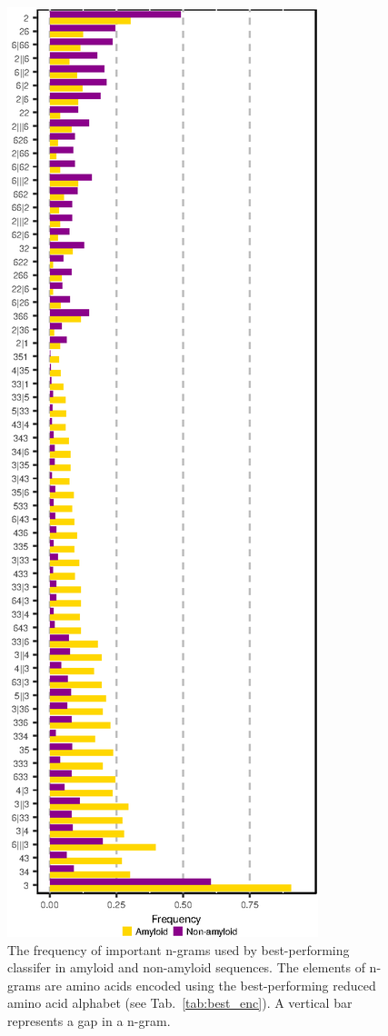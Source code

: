 \documentclass{bioinfo}
\begin{document}
\begin{figure}[!tpb]
\centerline{\includegraphics{figures/ngrams.eps}}
\caption{The frequency of important n-grams used by best-performing classifer 
in amyloid and non-amyloid sequences. The elements of n-grams 
are amino acids encoded using the best-performing reduced amino acid 
alphabet (see Tab.~\ref{tab:best_enc}). A vertical bar 
represents a gap in a n-gram.}\label{fig:ngrams}
\end{figure}
\end{document}
